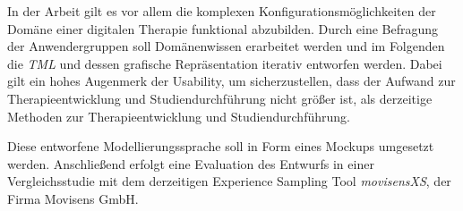 In der Arbeit gilt es vor allem die komplexen Konfigurationsmöglichkeiten der Domäne einer digitalen Therapie funktional abzubilden. Durch eine Befragung der Anwendergruppen soll Domänenwissen erarbeitet werden und im Folgenden die \emph{TML} und dessen grafische Repräsentation iterativ entworfen werden. Dabei gilt ein hohes Augenmerk der Usability, um sicherzustellen, dass der Aufwand zur Therapieentwicklung und Studiendurchführung nicht größer ist, als derzeitige Methoden zur Therapieentwicklung und Studiendurchführung.

Diese entworfene Modellierungssprache soll in Form eines Mockups umgesetzt werden. Anschließend erfolgt eine Evaluation des Entwurfs in einer Vergleichsstudie mit dem derzeitigen Experience Sampling Tool \emph{movisensXS}, der Firma Movisens GmbH. 







